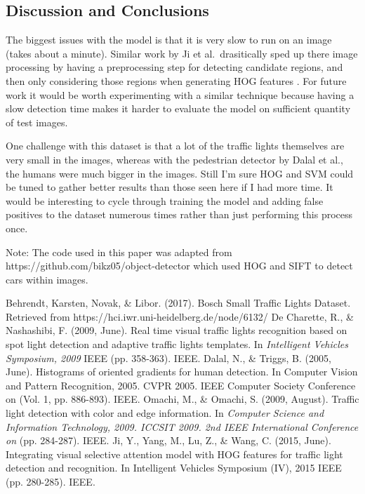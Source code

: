 \documentclass[a4paper]{article}
\begin{document}
\subsection{Discussion and Conclusions}
The biggest issues with the model is that it is very slow to run on an image (takes about a minute).  Similar work by Ji et al.\ drasitically sped up there image processing by having a preprocessing step for detecting candidate regions, and then only considering those regions when generating HOG features \cite{ji}.  For future work it would be worth experimenting with a similar technique because having a slow detection time makes it harder to evaluate the model on sufficient quantity of test images.

One challenge with this dataset is that a lot of the traffic lights themselves are very small in the images, whereas with the pedestrian detector by Dalal et al., the humans were much bigger in the images.  Still I'm sure HOG and SVM could be tuned to gather better results than those seen here if I had more time. It would be interesting to cycle through training the model and adding false positives to the dataset numerous times rather than just performing this process once.


Note: The code used in this paper was adapted from https://github.com/bikz05/object-detector which used HOG and SIFT to detect cars within images.


\begin{thebibliography}{9}
    Behrendt, Karsten, Novak, \& Libor. (2017). Bosch Small Traffic Lights Dataset. Retrieved from https://hci.iwr.uni-heidelberg.de/node/6132/
    De Charette, R., \& Nashashibi, F. (2009, June). Real time visual traffic lights recognition based on spot light detection and adaptive traffic lights templates. In \emph{Intelligent Vehicles Symposium, 2009} IEEE (pp. 358-363). IEEE.
    Dalal, N., \& Triggs, B. (2005, June). Histograms of oriented gradients for human detection. In Computer Vision and Pattern Recognition, 2005. CVPR 2005. IEEE Computer Society Conference on (Vol. 1, pp. 886-893). IEEE.
    Omachi, M., \& Omachi, S. (2009, August). Traffic light detection with color and edge information. In \emph{Computer Science and Information Technology, 2009. ICCSIT 2009. 2nd IEEE International Conference on} (pp. 284-287). IEEE.
    Ji, Y., Yang, M., Lu, Z., \& Wang, C. (2015, June). Integrating visual selective attention model with HOG features for traffic light detection and recognition. In Intelligent Vehicles Symposium (IV), 2015 IEEE (pp. 280-285). IEEE.


\end{thebibliography}
\end{document}
